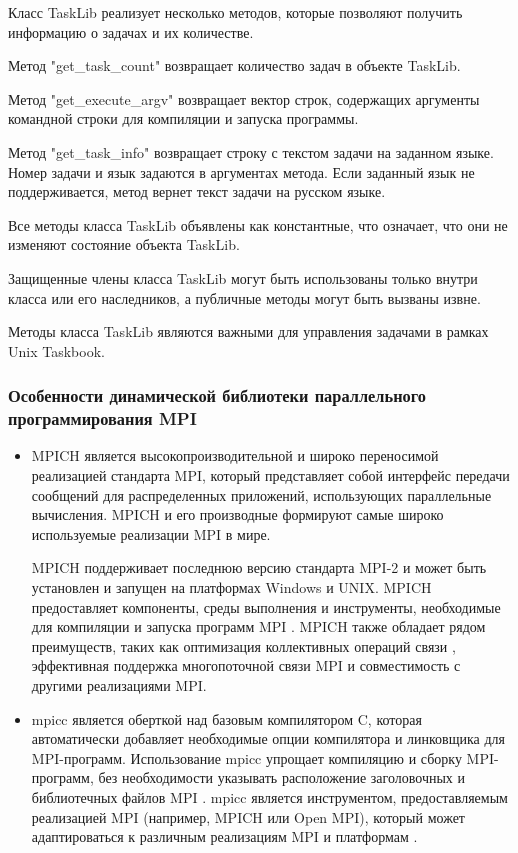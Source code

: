 Класс TaskLib реализует несколько методов, которые позволяют получить информацию о задачах и их количестве.

Метод "get\_task\_count" возвращает количество задач в объекте TaskLib.

Метод "get\_execute\_argv" возвращает вектор строк, содержащих аргументы командной строки для компиляции и запуска программы.

Метод "get\_task\_info" возвращает строку с текстом задачи на заданном языке. Номер задачи и язык задаются в аргументах метода. Если заданный язык не поддерживается, метод вернет текст задачи на русском языке.

Все методы класса TaskLib объявлены как константные, что означает, что они не изменяют состояние объекта TaskLib.

Защищенные члены класса TaskLib могут быть использованы только внутри класса или его наследников, а публичные методы могут быть вызваны извне.

Методы класса TaskLib являются важными для управления задачами в рамках Unix Taskbook.

\subsubsection{Особенности динамической библиотеки параллельного программирования MPI}

\begin{itemize}
	\item MPICH является высокопроизводительной и широко переносимой реализацией 
	стандарта MPI, который представляет собой интерфейс передачи сообщений для распределенных 
	приложений, использующих параллельные вычисления. MPICH и его производные формируют самые 
	широко используемые реализации MPI в мире. 
	
	MPICH поддерживает последнюю версию стандарта MPI-2 и может быть установлен и запущен
	 на платформах Windows и UNIX. MPICH предоставляет компоненты, среды выполнения и 
	 инструменты, необходимые для компиляции и запуска программ MPI \cite{ref3} \cite{ref5}. 
	 MPICH также обладает рядом преимуществ, таких как оптимизация коллективных операций 
	 связи \cite{ref4}, эффективная поддержка многопоточной связи MPI  и совместимость с 
	 другими реализациями MPI.
	
	\item 	mpicc является оберткой над базовым компилятором C, которая автоматически 
	добавляет необходимые опции компилятора и линковщика для MPI-программ. Использование
	mpicc упрощает компиляцию и сборку MPI-программ, без необходимости указывать 
	расположение заголовочных и библиотечных файлов MPI \cite{ref7} \cite{ref8}. 
	mpicc является инструментом, предоставляемым реализацией MPI (например, 
	MPICH или Open MPI), который может адаптироваться к различным реализациям 
	MPI и платформам \cite{ref9} \cite{ref10}.
\end{itemize}

